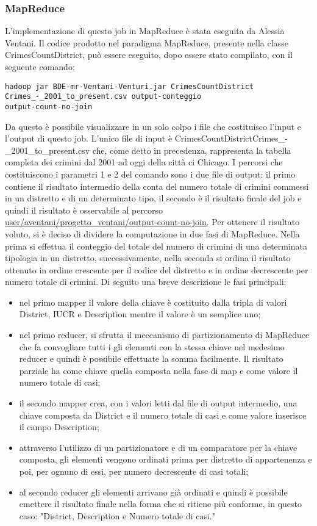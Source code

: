 \documentclass[10pt]{article}
\begin{document}
\subsubsection{MapReduce}
L'implementazione di questo job in MapReduce è stata eseguita da Alessia Ventani.
Il codice prodotto nel paradigma MapReduce, presente nella classe CrimesCountDistrict, può essere eseguito, dopo essere stato compilato, con il seguente comando:
\begin{lstlisting}
hadoop jar BDE-mr-Ventani-Venturi.jar CrimesCountDistrict 
Crimes_-_2001_to_present.csv output-conteggio  
output-count-no-join
\end{lstlisting}
Da questo è possibile visualizzare in un solo colpo i file che costituisco l'input e l'output di questo job. L'unico file di input è CrimesCountDistrictCrimes\_-\_2001\_to\_present.csv che, come detto in precedenza, rappresenta la tabella completa dei crimini dal 2001 ad oggi della città ci Chicago. I percorsi che costituiscono i parametri 1 e 2 del comando sono i due file di output: il primo contiene il risultato intermedio della conta del numero totale di crimini commessi in un distretto e di un determinato tipo, il secondo è il risultato finale del job e quindi il risultato è osservabile al percorso \url{user/aventani/progetto_ventani/output-count-no-join}.
Per ottenere il risultato voluto, si è deciso di dividere la computazione in due fasi di MapReduce. Nella prima si effettua il conteggio del totale del numero di crimini di una determinata tipologia in un distretto, successivamente, nella seconda si ordina il risultato ottenuto in ordine crescente per il codice del distretto e in ordine decrescente per numero totale di crimini.
Di seguito una breve descrizione le fasi principali:
\begin{itemize}
\item nel primo mapper il valore della chiave è costituito dalla tripla di valori District, IUCR e Description mentre il valore è un semplice uno;
\item nel primo reducer, si sfrutta il meccanismo di partizionamento di MapReduce che fa convogliare tutti i gli elementi con la stessa chiave nel medesimo reducer e quindi è possibile effettuate la somma facilmente. Il risultato parziale ha come chiave quella composta nella fase di map e come valore il numero totale di casi;
\item il secondo mapper crea, con i valori letti dal file di output intermedio, una chiave composta da District e il numero totale di casi e come valore inserisce il campo Description;
\item attraverso l'utilizzo di un partizionatore e di un comparatore per la chiave composta, gli elementi vengono ordinati prima per distretto di appartenenza e poi, per ognuno di essi, per numero decrescente di casi totali;
\item al secondo reducer gli elementi arrivano già ordinati e quindi è possibile emettere il risultato finale nella forma che si ritiene più conforme, in questo caso: "District, Description e Numero totale di casi."
\end{itemize}
\end{document}

